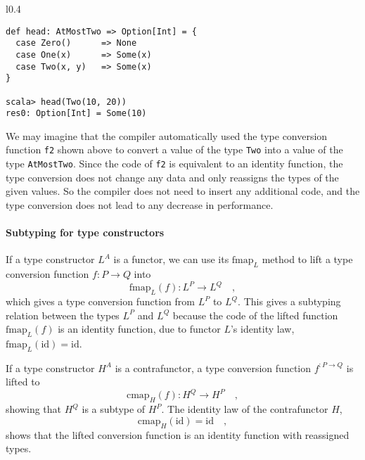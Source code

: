 \begin{wrapfigure}{l}{0.4\columnwidth}%
\vspace{-0.5\baselineskip}
\begin{lstlisting}
def head: AtMostTwo => Option[Int] = {
  case Zero()      => None
  case One(x)      => Some(x)
  case Two(x, y)   => Some(x)
}

scala> head(Two(10, 20))
res0: Option[Int] = Some(10)
\end{lstlisting}

\vspace{-1\baselineskip}
\end{wrapfigure}%
We may imagine that the compiler automatically used the type conversion
function \lstinline!f2! shown above to convert a value of the type
\lstinline!Two! into a value of the type \lstinline!AtMostTwo!.
Since the code of \lstinline!f2! is equivalent to an identity function,
the type conversion does not change any data and only reassigns the
types of the given values. So the compiler does not need to insert
any additional code, and the type conversion does not lead to any
decrease in performance.

\paragraph{Subtyping for type constructors}

If a type constructor $L^{A}$ is a functor, we can use its $\text{fmap}_{L}$
method to lift a type conversion function $f:P\rightarrow Q$ into
\[
\text{fmap}_{L}(f):L^{P}\rightarrow L^{Q}\quad,
\]
which gives a type conversion function from $L^{P}$ to $L^{Q}$.
This gives a subtyping relation between the types $L^{P}$ and $L^{Q}$
because the code of the lifted function $\text{fmap}_{L}(f)$ is an
identity function, due to functor $L$\textsf{'}s identity law, $\text{fmap}_{L}(\text{id})=\text{id}$. 

If a type constructor $H^{A}$ is a contrafunctor, a type conversion
function $f^{:P\rightarrow Q}$ is lifted to 
\[
\text{cmap}_{H}(f):H^{Q}\rightarrow H^{P}\quad,
\]
showing that $H^{Q}$ is a subtype of $H^{P}$. The identity law of
the contrafunctor $H$, 
\[
\text{cmap}_{H}(\text{id})=\text{id}\quad,
\]
shows that the lifted conversion function is an identity function
with reassigned types.

